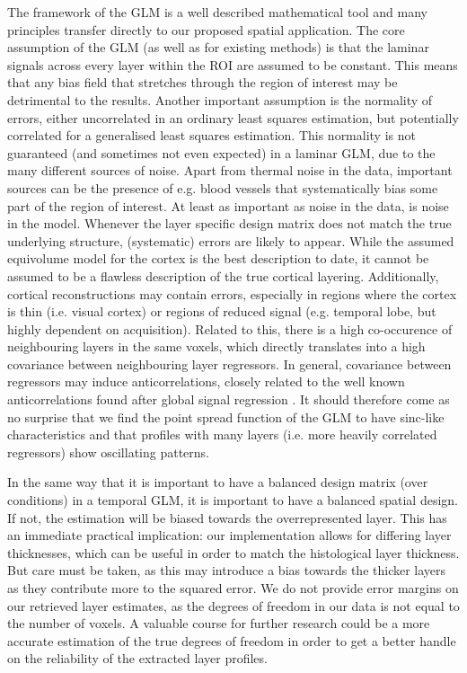 The framework of the GLM is a well described mathematical tool and many principles transfer directly to our proposed spatial application. The core assumption of the GLM (as well as for existing methods) is that the laminar signals across every layer within the ROI are assumed to be constant. This means that any bias field that stretches through the region of interest may be detrimental to the results. Another important assumption is the normality of errors, either uncorrelated in an ordinary least squares estimation, but potentially correlated for a generalised least squares estimation. This normality is not guaranteed (and sometimes not even expected) in a laminar GLM, due to the many different sources of noise. Apart from thermal noise in the data, important sources can be the presence of e.g. blood vessels that systematically bias some part of the region of interest.
%
At least as important as noise in the data, is noise in the model. Whenever the layer specific design matrix does not match the true underlying structure, (systematic) errors are likely to appear. While the assumed equivolume model for the cortex is the best description to date, it cannot be assumed to be a flawless description of the true cortical layering. Additionally, cortical reconstructions may contain errors, especially in regions where the cortex is thin (i.e. visual cortex) or regions of reduced signal (e.g. temporal lobe, but highly dependent on acquisition). Related to this, there is a high co-occurence of neighbouring layers in the same voxels, which directly translates into a high covariance between neighbouring layer regressors. In general, covariance between regressors may induce anticorrelations, closely related to the well known anticorrelations found after global signal regression \cite{Uddin2009}. It should therefore come as no surprise that we find the point spread function of the GLM to have sinc-like characteristics and that profiles with many layers (i.e. more heavily correlated regressors) show oscillating patterns.

In the same way that it is important to have a balanced design matrix (over conditions) in a temporal GLM, it is important to have a balanced spatial design. If not, the estimation will be biased towards the overrepresented layer. This has an immediate practical implication: our implementation allows for differing layer thicknesses, which can be useful in order to match the histological layer thickness. But care must be taken, as this may introduce a bias towards the thicker layers as they contribute more to the squared error.
We do not provide error margins on our retrieved layer estimates, as the degrees of freedom in our data is not equal to the number of voxels. A valuable course for further research could be a more accurate estimation of the true degrees of freedom in order to get a better handle on the reliability of the extracted layer profiles. 

